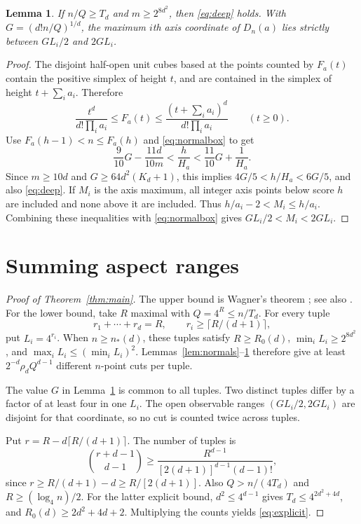 \documentclass[11pt,a4paper]{article}
\newtheorem{lemma}[theorem]{Lemma}
\theoremstyle{remark}
\newcommand{\ceil}[1]{\lceil#1\rceil}
\begin{document}
\begin{lemma}\label{lem:extents}
If \(n/Q\geq T_d\) and \(m\geq2^{8d^2}\), then
\eqref{eq:deep} holds. With \(G=(d!n/Q)^{1/d}\), the maximum
\(i\)th axis coordinate of \(D_n(a)\) lies strictly between
\(GL_i/2\) and \(2GL_i\).
\end{lemma}
\begin{proof}
The disjoint half-open unit cubes based at the points counted by
\(F_a(t)\) contain the positive simplex of height \(t\), and are
contained in the simplex of height \(t+\sum_i a_i\). Therefore
\[
 \frac{t^d}{d!\prod_i a_i}\leq F_a(t)
 \leq\frac{(t+\sum_i a_i)^d}{d!\prod_i a_i}\qquad(t\geq0).
\]
Use \(F_a(h-1)<n\leq F_a(h)\) and \eqref{eq:normalbox} to get
\[
 \frac9{10}G-\frac{11d}{10m}
 <\frac h{H_a}<\frac{11}{10}G+\frac1{H_a}.
\]
Since \(m\geq10d\) and \(G\geq64d^2(K_d+1)\), this implies
\(4G/5<h/H_a<6G/5\), and also \eqref{eq:deep}.
If \(M_i\) is the axis maximum, all integer axis points below score
\(h\) are included and none above it are included. Thus
\(h/a_i-2<M_i\leq h/a_i\).
Combining these inequalities with \eqref{eq:normalbox} gives
\(GL_i/2<M_i<2GL_i\).
\end{proof}

\section{Summing aspect ranges}
\begin{proof}[Proof of Theorem~\ref{thm:main}]
The upper bound is Wagner's theorem \cite{W02}; see also
\cite[Theorem 3.15]{W03}. For the lower bound, take
\(R\) maximal with \(Q=4^R\leq n/T_d\). For every tuple
\[
 r_1+\cdots+r_d=R,\qquad r_i\geq\ceil{R/(d+1)},
\]
put \(L_i=4^{r_i}\). When \(n\geq n_*(d)\), these tuples satisfy
\(R\geq R_0(d)\), \(\min_iL_i\geq2^{8d^2}\), and
\(\max_iL_i\leq(\min_iL_i)^2\).
Lemmas~\ref{lem:normals}--\ref{lem:extents} therefore give
at least \(2^{-d}\rho_dQ^{d-1}\) different \(n\)-point cuts per tuple.

The value \(G\) in Lemma~\ref{lem:extents} is common to all tuples.
Two distinct tuples differ by a factor of at least four in one \(L_i\).
The open observable ranges \((GL_i/2,2GL_i)\) are disjoint for that
coordinate, so no cut is counted twice across tuples.

Put \(r=R-d\ceil{R/(d+1)}\). The number of tuples is
\[
 \binom{r+d-1}{d-1}
 \geq\frac{R^{d-1}}{[2(d+1)]^{d-1}(d-1)!},
\]
since \(r\geq R/(d+1)-d\geq R/[2(d+1)]\).
Also \(Q>n/(4T_d)\) and \(R\geq(\log_4n)/2\).
For the latter explicit bound, \(d^2\leq4^{d-1}\) gives
\(T_d\leq4^{2d^2+4d}\), and
\(R_0(d)\geq2d^2+4d+2\).
Multiplying the counts yields \eqref{eq:explicit}.
\end{proof}
\end{document}
